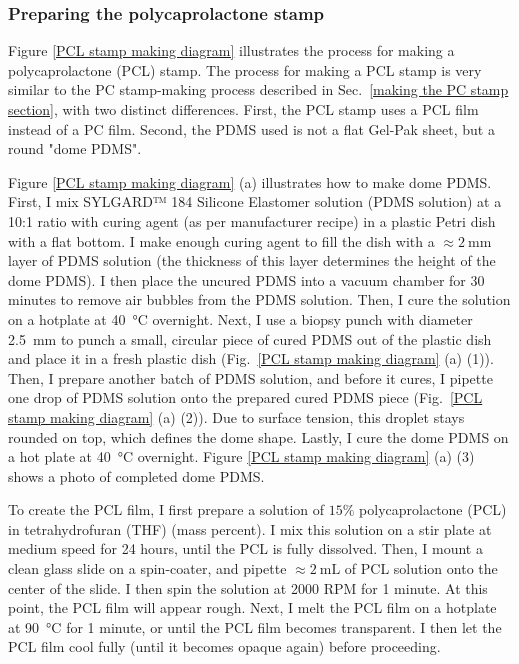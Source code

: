 \documentclass{beavtex_dub_edit}
\begin{document}
\subsubsection{Preparing the polycaprolactone stamp}


Figure \ref{PCL stamp making diagram} illustrates the process for making a polycaprolactone (PCL) stamp. The process for making a PCL stamp is very similar to the PC stamp-making process described in Sec.\ \ref{making the PC stamp section}, with two distinct differences. First, the PCL stamp uses a PCL film instead of a PC film. Second, the PDMS used is not a flat Gel-Pak sheet, but a round "dome PDMS". 

Figure \ref{PCL stamp making diagram} (a) illustrates how to make dome PDMS. First, I mix SYLGARD™ 184 Silicone Elastomer solution (PDMS solution) at a 10:1 ratio with curing agent (as per manufacturer recipe) in a plastic Petri dish with a flat bottom. I make enough curing agent to fill the dish with a $\approx \SI{2}{\milli\meter}$ layer of PDMS solution (the thickness of this layer determines the height of the dome PDMS). I then place the uncured PDMS into a vacuum chamber for 30 minutes to remove air bubbles from the PDMS solution. Then, I cure the solution on a hotplate at \SI{40}{\celsius} overnight. Next, I use a biopsy punch with diameter \SI{2.5}{\milli\meter} to punch a small, circular piece of cured PDMS out of the plastic dish and place it in a fresh plastic dish (Fig.\ \ref{PCL stamp making diagram} (a) (1)). Then, I prepare another batch of PDMS solution, and before it cures, I pipette one drop of PDMS solution onto the prepared cured PDMS piece (Fig.\ \ref{PCL stamp making diagram} (a) (2)). Due to surface tension, this droplet stays rounded on top, which defines the dome shape. Lastly, I cure the dome PDMS on a hot plate at \SI{40}{\celsius} overnight. Figure \ref{PCL stamp making diagram} (a) (3) shows a photo of completed dome PDMS.

To create the PCL film, I first prepare a solution of $15 \%$ polycaprolactone (PCL) in tetrahydrofuran (THF) (mass percent). I mix this solution on a stir plate at medium speed for 24  hours, until the PCL is fully dissolved. Then, I mount a clean glass slide on a spin-coater, and pipette $\approx \SI{2}{\milli\liter}$ of PCL solution onto the center of the slide. I then spin the solution at 2000 RPM for 1 minute. At this point, the PCL film will appear rough. Next, I melt the PCL film on a hotplate at \SI{90}{\celsius} for 1 minute, or until the PCL film becomes transparent. I then let the PCL film cool fully (until it becomes opaque again) before proceeding.
\end{document}
